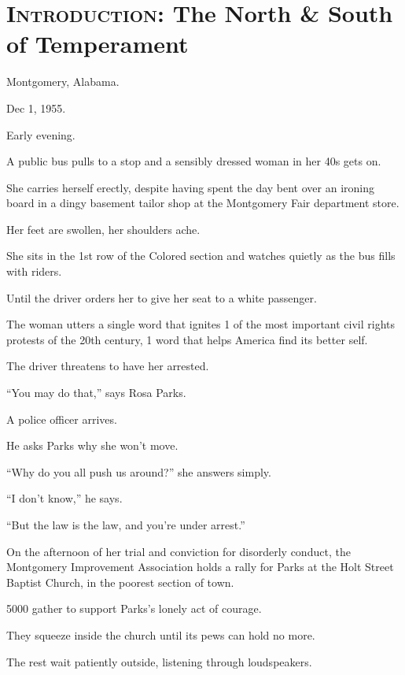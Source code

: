 \documentclass[oneside]{article}
\numberwithin{equation}{section}
\begin{document}

\section*{\textsc{Introduction}: The North \& South of Temperament}

Montgomery, Alabama.

Dec 1, 1955.

Early evening.

A public bus pulls to a stop and a sensibly dressed woman in her 40s gets on.

She carries herself erectly, despite having spent the day bent over an ironing board in a dingy basement tailor shop at the Montgomery Fair department store.

Her feet are swollen, her shoulders ache.

She sits in the 1st row of the Colored section and watches quietly as the bus fills with riders.

Until the driver orders her to give her seat to a white passenger.

%
The woman utters a single word that ignites 1 of the most important civil rights protests of the 20th century, 1 word that helps America find its better self.

%

%
The driver threatens to have her arrested.

%
``You may do that,'' says Rosa Parks.

%
A police officer arrives.

He asks Parks why she won't move.

%
``Why do you all push us around?'' she answers simply.

``I don't know,'' he says.

``But the law is the law, and you're under arrest.''

%
On the afternoon of her trial and conviction for disorderly conduct, the Montgomery Improvement Association holds a rally for Parks at the Holt Street Baptist Church, in the poorest section of town.

5000 gather to support Parks's lonely act of courage.

They squeeze inside the church until its pews can hold no more.

The rest wait patiently outside, listening through loudspeakers.
\end{document}
